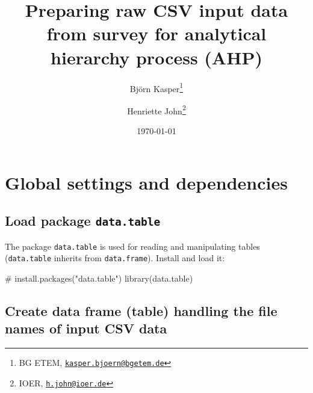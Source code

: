 \documentclass[
]{article}
\title{Preparing raw CSV input data from survey for analytical hierarchy
process (AHP)}
\author{Björn Kasper\footnote{BG ETEM,
  \href{mailto:kasper.bjoern@bgetem.de}{\nolinkurl{kasper.bjoern@bgetem.de}}} \and Henriette
John\footnote{IOER,
  \href{mailto:h.john@ioer.de}{\nolinkurl{h.john@ioer.de}}}}
\date{\today}
\newenvironment{Shaded}{\begin{snugshade}}{\end{snugshade}}
\newcommand{\CommentTok}[1]{\textcolor[rgb]{0.54,0.53,0.53}{#1}}
\newcommand{\FunctionTok}[1]{\textcolor[rgb]{0.39,0.29,0.61}{#1}}
\newcommand{\NormalTok}[1]{\textcolor[rgb]{0.12,0.11,0.11}{#1}}
\begin{document}
\maketitle

{
\setcounter{tocdepth}{2}
\tableofcontents
}
\hypertarget{global-settings-and-dependencies}{%
\section{Global settings and
dependencies}\label{global-settings-and-dependencies}}

\hypertarget{load-package-data.table}{%
\subsection{\texorpdfstring{Load package
\texttt{data.table}}{Load package data.table}}\label{load-package-data.table}}

The package \texttt{data.table} is used for reading and manipulating
tables (\texttt{data.table} inherits from \texttt{data.frame}). Install
and load it:

\begin{Shaded}
\begin{Highlighting}[]
\CommentTok{\# install.packages("data.table")}
\FunctionTok{library}\NormalTok{(data.table)}
\end{Highlighting}
\end{Shaded}

\hypertarget{create-data-frame-table-handling-the-file-names-of-input-csv-data}{%
\subsection{Create data frame (table) handling the file names of input
CSV
data}\label{create-data-frame-table-handling-the-file-names-of-input-csv-data}}
\end{document}
